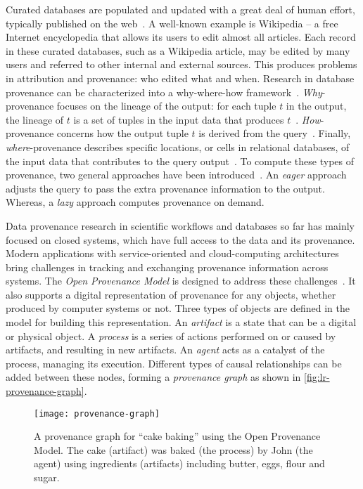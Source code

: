 Curated databases are populated and updated with a great deal of human effort, typically published on the web~\cite{Buneman2008}. A well-known example is Wikipedia -- a free Internet encyclopedia that allows its users to edit almost all articles. Each record in these curated databases, such as a Wikipedia article, may be edited by many users and referred to other internal and external sources. This produces problems in attribution and provenance: who edited what and when. Research in database provenance can be characterized into a why-where-how framework~\cite{Cheney2007}. \emph{Why}-provenance focuses on the lineage of the output: for each tuple $t$ in the output, the lineage of $t$ is a set of tuples in the input data that produces $t$~\cite{Cui2000}. \emph{How}-provenance concerns how the output tuple $t$ is derived from the query~\cite{Green2007}. Finally, \emph{where}-provenance describes specific locations, or cells in relational databases, of the input data that contributes to the query output~\cite{Buneman2001}. To compute these types of provenance, two general approaches have been introduced~\cite{Buneman2008}. An \emph{eager} approach adjusts the query to pass the extra provenance information to the output. Whereas, a \emph{lazy} approach computes provenance on demand.

Data provenance research in scientific workflows and databases so far has mainly focused on closed systems, which have full access to the data and its provenance. Modern applications with service-oriented and cloud-computing architectures bring challenges in tracking and exchanging provenance information across systems. The \emph{Open Provenance Model} is designed to address these challenges~\cite{Moreau2011}. It also supports a digital representation of provenance for any objects, whether produced by computer systems or not. Three types of objects are defined in the model for building this representation. An \emph{artifact} is a state that can be a digital or physical object. A \emph{process} is a series of actions performed on or caused by artifacts, and resulting in new artifacts. An \emph{agent} acts as a catalyst of the process, managing its execution. Different types of causal relationships can be added between these nodes, forming a \emph{provenance graph} as shown in \autoref{fig:lr-provenance-graph}.

\begin{figure}
	\centering
	\texttt{[image: provenance-graph]}
	\caption[An example of provenance graph]{A provenance graph for ``cake baking'' using the Open Provenance Model. The cake (artifact) was baked (the process) by John (the agent) using ingredients (artifacts) including butter, eggs, flour and sugar. }
	\label{fig:lr-provenance-graph}
\end{figure}

